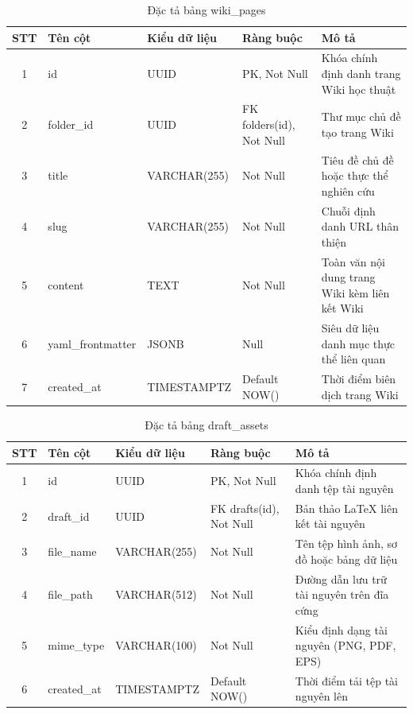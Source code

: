 \begin{table}[H]
\centering
\singlespacing
\fontsize{9pt}{11.5pt}\selectfont
\caption{Đặc tả bảng wiki\_pages}
\label{tab:app_wiki_pages}
\renewcommand{\arraystretch}{0.65}
\begin{tabularx}{\textwidth}{|c|>{\raggedright\arraybackslash}p{3.2cm}|>{\raggedright\arraybackslash}p{2.6cm}|>{\raggedright\arraybackslash}p{3.0cm}|>{\raggedright\arraybackslash}X|}
\hline
\textbf{STT} & \centering\textbf{Tên cột} & \centering\textbf{Kiểu dữ liệu} & \centering\textbf{Ràng buộc} & \centering\textbf{Mô tả} \tabularnewline \hline
1 & id & UUID & PK, Not Null & Khóa chính định danh trang Wiki học thuật \tabularnewline \hline
2 & folder\_id & UUID & FK folders(id), Not Null & Thư mục chủ đề tạo trang Wiki \tabularnewline \hline
3 & title & VARCHAR(255) & Not Null & Tiêu đề chủ đề hoặc thực thể nghiên cứu \tabularnewline \hline
4 & slug & VARCHAR(255) & Not Null & Chuỗi định danh URL thân thiện \tabularnewline \hline
5 & content & TEXT & Not Null & Toàn văn nội dung trang Wiki kèm liên kết Wiki \tabularnewline \hline
6 & yaml\_frontmatter & JSONB & Null & Siêu dữ liệu danh mục thực thể liên quan \tabularnewline \hline
7 & created\_at & TIMESTAMPTZ & Default NOW() & Thời điểm biên dịch trang Wiki \tabularnewline \hline
\end{tabularx}
\end{table}

\begin{table}[H]
\centering
\singlespacing
\fontsize{9pt}{11.5pt}\selectfont
\caption{Đặc tả bảng draft\_assets}
\label{tab:app_draft_assets}
\renewcommand{\arraystretch}{0.65}
\begin{tabularx}{\textwidth}{|c|>{\raggedright\arraybackslash}p{3.2cm}|>{\raggedright\arraybackslash}p{2.6cm}|>{\raggedright\arraybackslash}p{3.0cm}|>{\raggedright\arraybackslash}X|}
\hline
\textbf{STT} & \centering\textbf{Tên cột} & \centering\textbf{Kiểu dữ liệu} & \centering\textbf{Ràng buộc} & \centering\textbf{Mô tả} \tabularnewline \hline
1 & id & UUID & PK, Not Null & Khóa chính định danh tệp tài nguyên \tabularnewline \hline
2 & draft\_id & UUID & FK drafts(id), Not Null & Bản thảo LaTeX liên kết tài nguyên \tabularnewline \hline
3 & file\_name & VARCHAR(255) & Not Null & Tên tệp hình ảnh, sơ đồ hoặc bảng dữ liệu \tabularnewline \hline
4 & file\_path & VARCHAR(512) & Not Null & Đường dẫn lưu trữ tài nguyên trên đĩa cứng \tabularnewline \hline
5 & mime\_type & VARCHAR(100) & Not Null & Kiểu định dạng tài nguyên (PNG, PDF, EPS) \tabularnewline \hline
6 & created\_at & TIMESTAMPTZ & Default NOW() & Thời điểm tải tệp tài nguyên lên \tabularnewline \hline
\end{tabularx}
\end{table}

